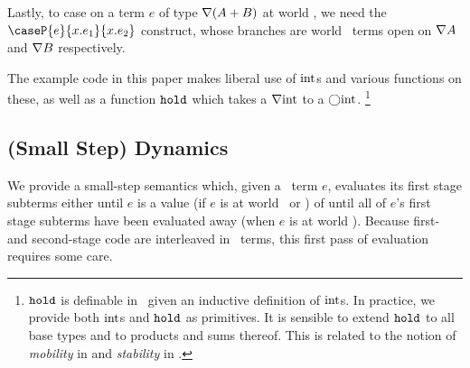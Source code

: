 \begin{abstrsyn}
Lastly, to case on a term $e$ of type $\nabla(A+B)$ at world \bbonem, we need the
$\caseP{e}{x.e_1}{x.e_2}$ construct, whose branches are world \bbonem\ terms
open on $\nabla{A}$ and $\nabla{B}$ respectively.

The example code in this paper makes liberal use of ${\rm int}$s and various
functions on these, as well as a function ${\tt hold}$ which takes a $\nabla{\rm int}$
to a $\bigcirc{\rm int}$.%
\footnote{${\tt hold}$ is definable in \lang\ given an inductive definition of
${\rm int}$s. In practice, we provide both ${\rm int}$s and ${\tt hold}$ as primitives.
It is sensible to extend ${\tt hold}$ to all base types and to products and sums
thereof. This is related to the notion of {\em mobility} in \cite{murphy05} and
{\em stability} in \cite{krishnaswami13}.}

\end{abstrsyn}


\subsection{(Small Step) Dynamics}
We provide a small-step semantics which,
given a \lang\ term $e$, evaluates its first stage subterms
either until $e$ is a value (if $e$ is at world \bbonep\ or \bbonem)
of until all of $e$'s first stage subterms have been evaluated away
(when $e$ is at world \bbtwo).
Because first- and second-stage code are
interleaved in \lang\ terms, this first pass of
evaluation requires some care.

